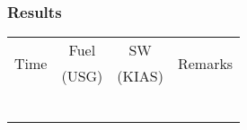% 
% 
%
\Large
\subsubsection*{Results}
  \settowidth{\colOne}{Time}
  \settowidth{\colFour}{Remarks}
  \begin{tabularx}{\textwidth}{|c|c|c|X|}
    \hline
    \multirow{2}{\colOne}{\centering Time}&Fuel&SW&\multirow{2}{\colOne}{Remarks}\\
    &(USG)&(KIAS)&\\
    \hline
    \hline
    &&&\\
    \hline
    &&&\\
    \hline
    &&&\\
    \hline
    &&&\\
    \hline
    &&&\\
    \hline
    &&&\\
    \hline
    \end{tabularx}     
\normalsize
   